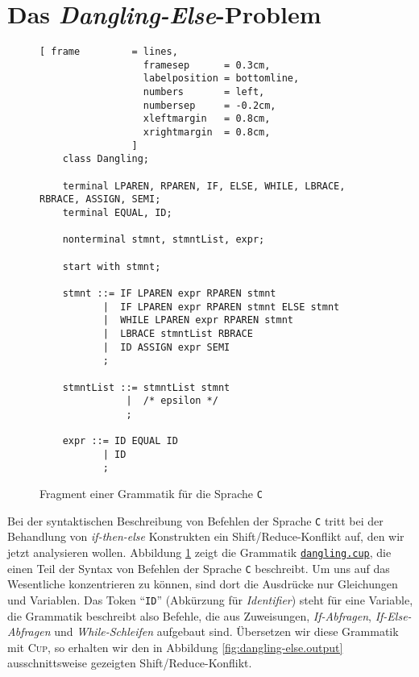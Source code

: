 \section{Das \emph{Dangling-Else}-Problem}
\begin{figure}[!ht]
\centering
\begin{Verbatim}[ frame         = lines, 
                  framesep      = 0.3cm, 
                  labelposition = bottomline,
                  numbers       = left,
                  numbersep     = -0.2cm,
                  xleftmargin   = 0.8cm,
                  xrightmargin  = 0.8cm,
                ]
    class Dangling;
    
    terminal LPAREN, RPAREN, IF, ELSE, WHILE, LBRACE, RBRACE, ASSIGN, SEMI;
    terminal EQUAL, ID;
    
    nonterminal stmnt, stmntList, expr;
    
    start with stmnt;
    
    stmnt ::= IF LPAREN expr RPAREN stmnt
           |  IF LPAREN expr RPAREN stmnt ELSE stmnt
           |  WHILE LPAREN expr RPAREN stmnt
           |  LBRACE stmntList RBRACE
           |  ID ASSIGN expr SEMI
           ;
      
    stmntList ::= stmntList stmnt
               |  /* epsilon */
               ;
    
    expr ::= ID EQUAL ID
           | ID
           ;
\end{Verbatim}
\vspace*{-0.3cm}
\caption{Fragment einer Grammatik f\"ur die Sprache \texttt{C}}
\label{fig:dangling-else.y}
\end{figure}

\noindent
Bei der syntaktischen Beschreibung von Befehlen der Sprache \texttt{C} tritt bei der Behandlung
von \emph{if-then-else} Konstrukten ein Shift/Reduce-Konflikt auf, den wir jetzt analysieren wollen.
Abbildung \ref{fig:dangling-else.y} zeigt die Grammatik 
\href{https://github.com/karlstroetmann/Formal-Languages/tree/master/Cup/DanglingElse/dangling.cup}{\texttt{dangling.cup}},
die einen Teil der Syntax von Befehlen der Sprache \texttt{C} beschreibt.  Um uns auf das
Wesentliche konzentrieren zu k\"onnen, sind dort die Ausdr\"ucke nur Gleichungen und Variablen.  Das
Token ``\texttt{ID}'' (Abk\"urzung f\"ur \textsl{Identifier}) steht f\"ur eine Variable, die Grammatik
beschreibt also Befehle, die aus Zuweisungen, \emph{If-Abfragen}, \emph{If-Else-Abfragen} und
\emph{While-Schleifen} aufgebaut sind.  \"Ubersetzen wir diese Grammatik mit \textsc{Cup}, so erhalten
wir den in Abbildung \ref{fig:dangling-else.output} ausschnittsweise gezeigten 
Shift/Reduce-Konflikt. 


